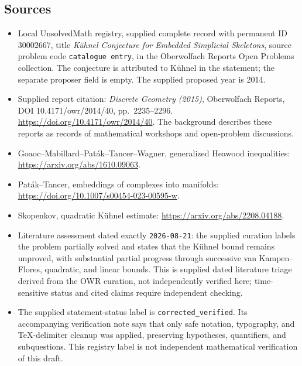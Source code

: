 \documentclass[11pt]{article}
\begin{document}
\subsection{Sources}
\begin{itemize}
\item Local UnsolvedMath registry, supplied complete record with permanent ID \(30002667\), title \emph{Kühnel Conjecture for Embedded Simplicial Skeletons}, source problem code \texttt{catalogue entry}, in the Oberwolfach Reports Open Problems collection. The conjecture is attributed to Kühnel in the statement; the separate proposer field is empty. The supplied proposed year is 2014.
\item Supplied report citation: \emph{Discrete Geometry (2015)}, Oberwolfach Reports, DOI 10.4171/owr/2014/40, pp.\ 2235--2296. \url{https://doi.org/10.4171/owr/2014/40}. The background describes these reports as records of mathematical workshops and open-problem discussions.
\item Goaoc--Mabillard--Paták--Tancer--Wagner, generalized Heawood inequalities: \url{https://arxiv.org/abs/1610.09063}.
\item Paták--Tancer, embeddings of complexes into manifolds: \url{https://doi.org/10.1007/s00454-023-00595-w}.
\item Skopenkov, quadratic Kühnel estimate: \url{https://arxiv.org/abs/2208.04188}.
\item Literature assessment dated exactly \texttt{2026-08-21}: the supplied curation labels the problem partially solved and states that the Kühnel bound remains unproved, with substantial partial progress through successive van Kampen--Flores, quadratic, and linear bounds. This is supplied dated literature triage derived from the OWR curation, not independently verified here; time-sensitive status and cited claims require independent checking.
\item The supplied statement-status label is \texttt{corrected\_verified}. Its accompanying verification note says that only safe notation, typography, and TeX-delimiter cleanup was applied, preserving hypotheses, quantifiers, and subquestions. This registry label is not independent mathematical verification of this draft.
\end{itemize}
\end{document}
